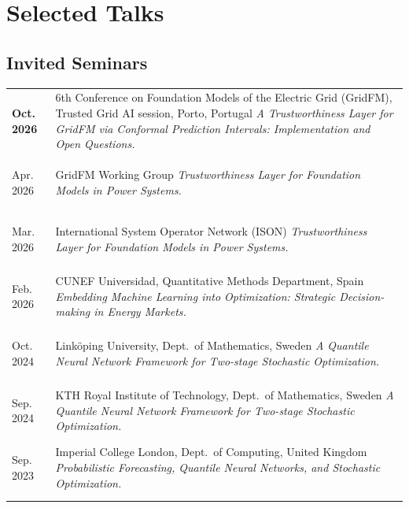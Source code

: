 \documentclass[10pt,a4paper]{article}
\makeatletter
\newenvironment{cvtable}
  {\begin{longtable}{@{} >{\raggedright\arraybackslash\bfseries}p{0.135\textwidth}
                        !{\color{rulegray}\vrule width 0.9pt}
                        >{\raggedright\arraybackslash}p{0.83\textwidth} @{}}}
  {\end{longtable}}
\newcommand{\cvitem}[2]{%
  #1 & #2 \tabularnewline \noalign{\vskip 4pt}%
}
\makeatother
\begin{document}
\section*{Selected Talks}

\subsection*{Invited Seminars}
\begin{cvtable}
    \cvitem{Oct. 2026}{6th Conference on Foundation Models of the Electric Grid (GridFM),
    Trusted Grid AI session, Porto, Portugal\newline
    \textit{A Trustworthiness Layer for GridFM via Conformal Prediction Intervals: Implementation and Open Questions.}}
    \cvitem{Apr. 2026}{GridFM Working Group\newline
    \textit{Trustworthiness Layer for Foundation Models in Power Systems.}}
    \cvitem{Mar. 2026}{International System Operator Network (ISON)\newline
    \textit{Trustworthiness Layer for Foundation Models in Power Systems.}}
    \cvitem{Feb. 2026}{CUNEF Universidad, Quantitative Methods Department, Spain\newline
    \textit{Embedding Machine Learning into Optimization: Strategic Decision-making in Energy Markets.}}
    \cvitem{Oct. 2024}{Link\"oping University, Dept.\ of Mathematics, Sweden\newline
    \textit{A Quantile Neural Network Framework for Two-stage Stochastic Optimization.}}
    \cvitem{Sep. 2024}{KTH Royal Institute of Technology, Dept.\ of Mathematics, Sweden\newline
    \textit{A Quantile Neural Network Framework for Two-stage Stochastic Optimization.}}
    \cvitem{Sep. 2023}{Imperial College London, Dept.\ of Computing, United Kingdom\newline
    \textit{Probabilistic Forecasting, Quantile Neural Networks, and Stochastic Optimization.}}
\end{cvtable}
\end{document}
